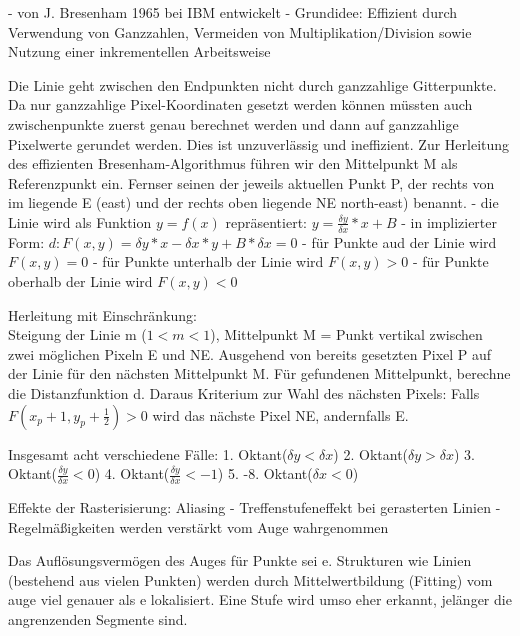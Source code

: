 \documentclass[10pt,landscape]{article}
\makeatletter
\renewcommand{\subsection}{\@startsection{subsection}{2}{0mm}%
                                {-1explus -.5ex minus -.2ex}%
                                {0.5ex plus .2ex}%
                                {\normalfont\normalsize\bfseries}}
\makeatother
\begin{document}
\begin{multicols}{3}
- von J. Bresenham 1965 bei IBM entwickelt
- Grundidee: Effizient durch Verwendung von Ganzzahlen, Vermeiden von Multiplikation/Division sowie Nutzung einer inkrementellen Arbeitsweise

Die Linie geht zwischen den Endpunkten nicht durch ganzzahlige Gitterpunkte. Da nur ganzzahlige Pixel-Koordinaten gesetzt werden können müssten auch zwischenpunkte zuerst genau berechnet werden und dann auf ganzzahlige Pixelwerte gerundet werden. Dies ist unzuverlässig und ineffizient. Zur Herleitung des effizienten Bresenham-Algorithmus führen wir den Mittelpunkt M als Referenzpunkt ein. Fernser seinen der jeweils aktuellen Punkt P, der rechts von im liegende E (east) und der rechts oben liegende NE north-east) benannt.
- die Linie wird als Funktion $y=f(x)$ repräsentiert: $y=\frac{\delta y}{\delta x}*x+B$
- in implizierter Form: $d: F(x,y)=\delta y*x-\delta x*y+B*\delta x = 0$
- für Punkte aud der Linie wird $F(x,y)=0$
- für Punkte unterhalb der Linie wird $F(x,y)>0$
- für Punkte oberhalb der Linie wird $F(x,y)<0$

Herleitung mit Einschränkung:\\
Steigung der Linie m ($1 < m < 1$), Mittelpunkt M = Punkt vertikal zwischen zwei möglichen Pixeln E und NE. Ausgehend von bereits gesetzten Pixel P auf der Linie für den nächsten Mittelpunkt M. Für gefundenen Mittelpunkt, berechne die Distanzfunktion d. Daraus Kriterium zur Wahl des nächsten Pixels: Falls $F(x_p + 1, y_p+\frac{1}{2})>0$ wird das nächste Pixel NE, andernfalls E.

Insgesamt acht verschiedene Fälle:
1. Oktant($\delta y < \delta x$)
2. Oktant($\delta y > \delta x$)
3. Oktant($\frac{\delta y}{\delta x}<  0$)
4. Oktant($\frac{\delta y}{\delta x}< -1$)
5. -8. Oktant($\delta x < 0$)

Effekte der Rasterisierung: Aliasing
- Treffenstufeneffekt bei gerasterten Linien
- Regelmäßigkeiten werden verstärkt vom Auge wahrgenommen

Das Auflösungsvermögen des Auges für Punkte sei e. Strukturen wie Linien (bestehend aus vielen Punkten) werden durch Mittelwertbildung (Fitting) vom auge viel genauer als e lokalisiert. Eine Stufe wird umso eher erkannt, jelänger die angrenzenden Segmente sind.


\end{multicols}
\end{document}
